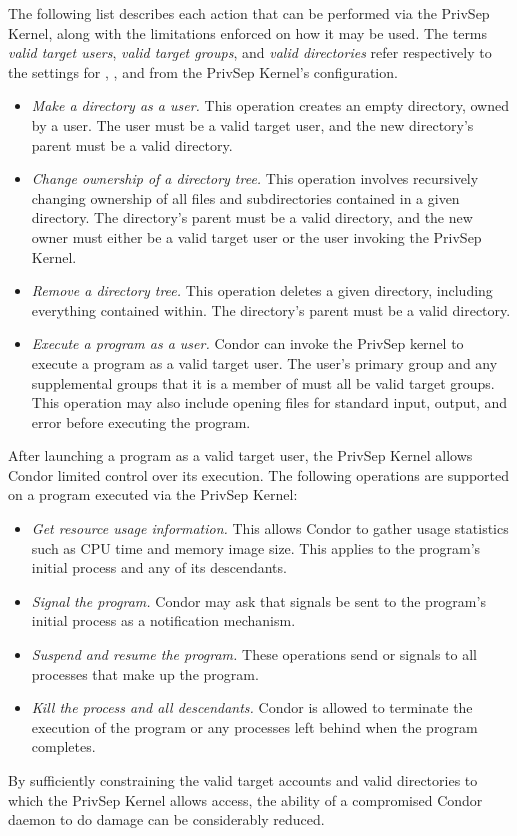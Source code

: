 The following list describes each action that can be performed via the
PrivSep Kernel, along with the limitations enforced on how it may be
used. The terms \emph{valid target users}, \emph{valid target groups},
and \emph{valid directories} refer respectively to the settings for
, , and
 from the PrivSep Kernel's configuration.

\begin{itemize}

\item \emph{Make a directory as a user.} This operation creates
an empty directory, owned by a user. The user must be a valid target
user, and the new directory's parent must be a valid directory.

\item \emph{Change ownership of a directory tree.} This operation
involves recursively changing ownership of all files and
subdirectories contained in a given directory. The directory's parent
must be a valid directory, and the new owner must either be a valid
target user or the user invoking the PrivSep Kernel.

\item \emph{Remove a directory tree.} This operation deletes a given directory,
including everything contained within. The directory's parent must be
a valid directory.

\item \emph{Execute a program as a user.} Condor can invoke the
PrivSep kernel to execute a program as a valid target user. The user's
primary group and any supplemental groups that it is a member of must
all be valid target groups. This operation may also include opening
files for standard input, output, and error before executing the
program.

\end{itemize}

After launching a program as a valid target user, the PrivSep Kernel
allows Condor limited control over its execution. The following
operations are supported on a program executed via the PrivSep Kernel:

\begin{itemize}

\item \emph{Get resource usage information.} This allows Condor to
gather usage statistics such as CPU time and memory image size. This
applies to the program's initial process and any of its descendants.

\item \emph{Signal the program.} Condor may ask that signals be sent
to the program's initial process as a notification mechanism.

\item \emph{Suspend and resume the program.} These operations send
 or  signals to all processes that make up
the program.

\item \emph{Kill the process and all descendants.} Condor is allowed
to terminate the execution of the program or any processes
left behind when the program completes.

\end{itemize}

By sufficiently constraining the valid target
accounts and valid directories to which the PrivSep Kernel allows
access, the ability of a compromised Condor daemon to do damage can
be considerably reduced.


